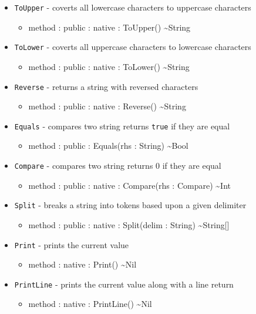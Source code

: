 \documentclass[11pt]{article}
\begin{document}
\begin{itemize}
\begin{itemize}
  \end{itemize}
\item \texttt{ToUpper} - coverts all lowercase characters to uppercase
  characters
  \begin{itemize}
  \item method : public : native : ToUpper() \textasciitilde String
  \end{itemize}
\item \texttt{ToLower} - coverts all uppercase characters to lowercase
  characters
  \begin{itemize}
  \item method : public : native : ToLower() \textasciitilde String
  \end{itemize}
\item \texttt{Reverse} - returns a string with reversed characters
  \begin{itemize}
  \item method : public : native : Reverse() \textasciitilde String
  \end{itemize}
\item \texttt{Equals} - compares two string returns \texttt{true} if
  they are equal
  \begin{itemize}
  \item method : public : Equals(rhs : String) \textasciitilde Bool
  \end{itemize}
\item \texttt{Compare} - compares two string returns 0 if they are
  equal
  \begin{itemize}
  \item method : public : native : Compare(rhs : Compare) \textasciitilde Int
  \end{itemize}
\item \texttt{Split} - breaks a string into tokens based upon a given
  delimiter
  \begin{itemize}
  \item method : public : native : Split(delim : String) \textasciitilde String[]
  \end{itemize}
\item \texttt{Print} - prints the current value
  \begin{itemize}
  \item method : native : Print() \textasciitilde Nil
  \end{itemize}
\item \texttt{PrintLine} - prints the current value along with a line
  return
  \begin{itemize}
  \item method : native : PrintLine() \textasciitilde Nil
  \end{itemize}
\end{itemize}
\end{document}
